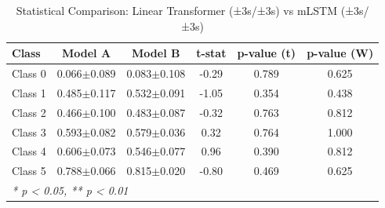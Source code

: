 \begin{table}[htbp]
\centering
\caption{Statistical Comparison: Linear Transformer (±3s/±3s) vs mLSTM (±3s/±3s)}
\label{tab:comparison_class_linear_transformer_±3s_±3s_vs_mlstm_±3s_±3s}
\begin{tabular}{lccccc}
\toprule
\textbf{Class} & \textbf{Model A} & \textbf{Model B} & \textbf{t-stat} & \textbf{p-value (t)} & \textbf{p-value (W)} \\
\midrule
Class 0 & 0.066$\pm$0.089 & 0.083$\pm$0.108 & -0.29 & 0.789 & 0.625 \\
Class 1 & 0.485$\pm$0.117 & 0.532$\pm$0.091 & -1.05 & 0.354 & 0.438 \\
Class 2 & 0.466$\pm$0.100 & 0.483$\pm$0.087 & -0.32 & 0.763 & 0.812 \\
Class 3 & 0.593$\pm$0.082 & 0.579$\pm$0.036 & 0.32 & 0.764 & 1.000 \\
Class 4 & 0.606$\pm$0.073 & 0.546$\pm$0.077 & 0.96 & 0.390 & 0.812 \\
Class 5 & 0.788$\pm$0.066 & 0.815$\pm$0.020 & -0.80 & 0.469 & 0.625 \\
\bottomrule
\multicolumn{6}{l}{\textit{* p < 0.05, ** p < 0.01}} \\
\end{tabular}
\end{table}
